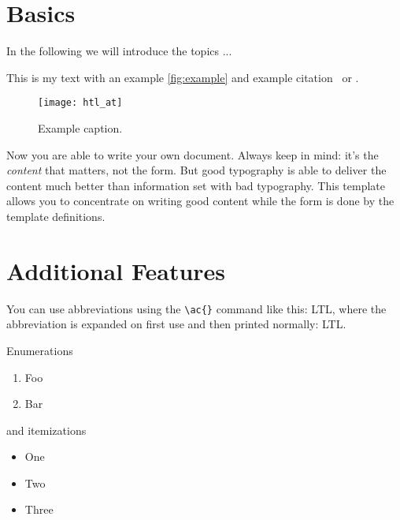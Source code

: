 



\section{Basics}
In the following we will  introduce the topics ... 

This is my text with an example \autoref{fig:example} and example
citation~\cite{Bringhurst1993} or \textcite{Bringhurst1993}. 

\begin{figure}
	\centering
	\texttt{[image: htl\_at]}
	\caption{Example caption.}
	\label{fig:example}
\end{figure}

Now you are able to write your own document. Always keep in mind: it's
the \emph{content} that matters, not the form. But good typography is
able to deliver the content much better than information set with bad
typography. This template allows you to concentrate on writing good
content while the form is done by the template definitions.

\section{Additional Features}

You can use abbreviations using the \verb+\ac{}+ command like this: \ac{LTL}, 
where the abbreviation is expanded on first use and then printed normally: \ac{LTL}. 

Enumerations
\begin{enumerate}
	\item Foo
	\item Bar
\end{enumerate}

and itemizations
\begin{itemize}
	\item One
	\item Two
	\item Three
\end{itemize}

